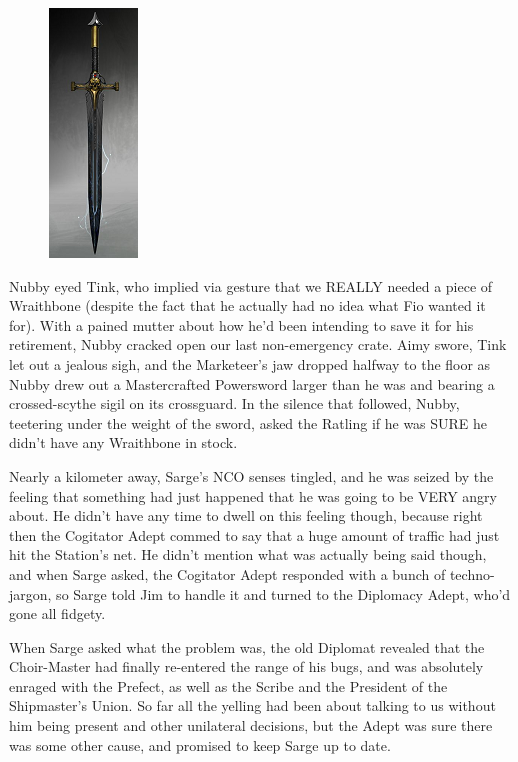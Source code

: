 \begin{figure}
	\begin{center}
		\includegraphics[width=\figwidth]{pics/14/21.png}
	\end{center}
\end{figure}
Nubby eyed Tink, who implied via gesture that we REALLY needed a piece of Wraithbone (despite the fact that he actually had no idea what Fio wanted it for). 
With a pained mutter about how he'd been intending to save it for his retirement, Nubby cracked open our last non-emergency crate. 
Aimy swore, Tink let out a jealous sigh, and the Marketeer's jaw dropped halfway to the floor as Nubby drew out a Mastercrafted Powersword larger than he was and bearing a crossed-scythe sigil on its crossguard. 
In the silence that followed, Nubby, teetering under the weight of the sword, asked the Ratling if he was SURE he didn't have any Wraithbone in stock.

Nearly a kilometer away, Sarge's NCO senses tingled, and he was seized by the feeling that something had just happened that he was going to be VERY angry about. 
He didn't have any time to dwell on this feeling though, because right then the Cogitator Adept commed to say that a huge amount of traffic had just hit the Station's net. 
He didn't mention what was actually being said though, and when Sarge asked, the Cogitator Adept responded with a bunch of techno-jargon, so Sarge told Jim to handle it and turned to the Diplomacy Adept, who'd gone all fidgety. 


When Sarge asked what the problem was, the old Diplomat revealed that the Choir-Master had finally re-entered the range of his bugs, and was absolutely enraged with the Prefect, as well as the Scribe and the President of the Shipmaster's Union. 
So far all the yelling had been about talking to us without him being present and other unilateral decisions, but the Adept was sure there was some other cause, and promised to keep Sarge up to date.

